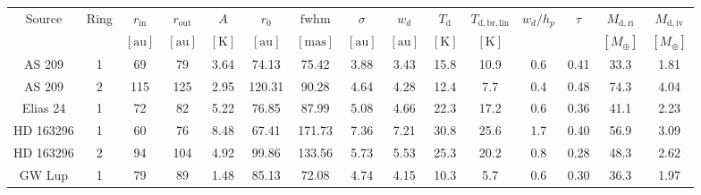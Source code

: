 \documentclass{aa}
\begin{document}
\begin{table*}
\begin{center}
\begin{tabular}{|cc|cc|ccccc|cccccc|}
\hline
\hline
Source & Ring & $r_{\mathrm{in}}$ & $r_{\mathrm{out}}$ & $A$ & $r_0$ & $\mathrm{fwhm}$ & $\sigma$ & $w_d$ & $T_{\mathrm{d}}$ & $T_{\mathrm{d,br,lin}}$ & $w_d/h_p$ & $\tau$ & $M_{\mathrm{d,ri}}$ & $M_{\mathrm{d,iv}}$\\
            & & $[\mathrm{au}]$ & $[\mathrm{au}]$ & $[\mathrm{K}]$ & $[\mathrm{au}]$ & $[\mathrm{mas}]$ & $[\mathrm{au}]$ & $[\mathrm{au}]$ & $\mathrm{[K]}$ & $\mathrm{[K]}$ &  &  & $[M_{\oplus}]$ & $[M_{\oplus}]$\\
\hline
AS 209     & 1 &  69 &  79 &   3.64 &  74.13 &  75.42 &   3.88 &   3.43 &  15.8 &  10.9 &   0.6 &   0.41 &  33.3 &   1.81\\
AS 209     & 2 & 115 & 125 &   2.95 & 120.31 &  90.28 &   4.64 &   4.28 &  12.4 &   7.7 &   0.4 &   0.48 &  74.3 &   4.04\\
Elias 24   & 1 &  72 &  82 &   5.22 &  76.85 &  87.99 &   5.08 &   4.66 &  22.3 &  17.2 &   0.6 &   0.36 &  41.1 &   2.23\\
HD 163296  & 1 &  60 &  76 &   8.48 &  67.41 & 171.73 &   7.36 &   7.21 &  30.8 &  25.6 &   1.7 &   0.40 &  56.9 &   3.09\\
HD 163296  & 2 &  94 & 104 &   4.92 &  99.86 & 133.56 &   5.73 &   5.53 &  25.3 &  20.2 &   0.8 &   0.28 &  48.3 &   2.62\\
GW Lup     & 1 &  79 &  89 &   1.48 &  85.13 &  72.08 &   4.74 &   4.15 &  10.3 &   5.7 &   0.6 &   0.30 &  36.3 &   1.97\\

\end{tabular}
\end{center}
\end{table*}
\end{document}
